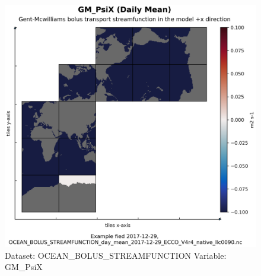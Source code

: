 \begin{figure}[H]
\centering
\includegraphics[scale=0.55]{../images/plots/native_plots/Gent-McWilliams_Bolus_Transport_Streamfunction/GM_PsiX.png}
\caption{Dataset: OCEAN\_BOLUS\_STREAMFUNCTION Variable: GM\_PsiX}
\label{tab:table-OCEAN_BOLUS_STREAMFUNCTION_GM_PsiX-Plot}
\end{figure}
\pagebreak
